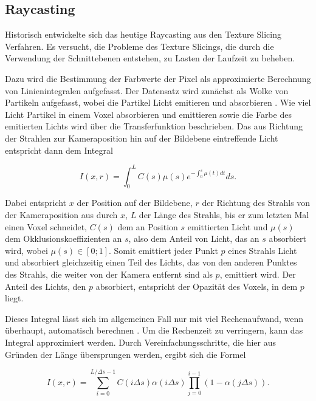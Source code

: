 \documentclass[a4paper,fontsize=12pt,toc=bib,parskip=half,ngerman]{scrartcl}
\begin{document}
\subsection{Raycasting}
\label{sec:Raycasting}

Historisch entwickelte sich das heutige Raycasting aus den Texture Slicing Verfahren. Es versucht, die Probleme des Texture Slicings, die durch die Verwendung der Schnittebenen entstehen, zu Lasten der Laufzeit zu beheben.

Dazu wird die Bestimmung der Farbwerte der Pixel als approximierte Berechnung von Linienintegralen aufgefasst. Der Datensatz wird zun\"achst als Wolke von Partikeln aufgefasst, wobei die Partikel Licht emitieren und absorbieren \cite[s.~134~f.]{hansen2005visualization}. Wie viel Licht Partikel in einem Voxel absorbieren und emittieren sowie die Farbe des emitierten Lichts wird \"uber die Transferfunktion beschrieben. Das aus Richtung der Strahlen zur Kameraposition hin auf der Bildebene eintreffende Licht entspricht dann dem Integral 

\begin{equation}
I(x,r) = \int_{0}^{L} C(s)\mu(s) e^{-\int_{0}^{s}\mu(t)dt}ds.
\end{equation}

Dabei entspricht $x$ der Position auf der Bildebene, $r$ der Richtung des Strahls von der Kameraposition aus durch $x$, $L$ der L\"ange des Strahls, bis er zum letzten Mal einen Voxel schneidet, $C(s)$ dem an Position $s$ emittierten Licht und $\mu(s)$ dem Okklusionskoeffizienten an $s$, also dem Anteil von Licht, das an $s$ absorbiert wird, wobei $\mu(s) \in [0;1]$. Somit emittiert jeder Punkt $p$ eines Strahls Licht und absorbiert gleichzeitig einen Teil des Lichts, das von den anderen Punktes des Strahls, die weiter von der Kamera entfernt sind als $p$, emittiert wird. Der Anteil des Lichts, den $p$ absorbiert, entspricht der Opazit\"at des Voxels, in dem $p$ liegt.

Dieses Integral l\"asst sich im allgemeinen Fall nur mit viel Rechenaufwand, wenn \"uberhaupt, automatisch berechnen \cite[S.~136]{hansen2005visualization}. Um die Rechenzeit zu verringern, kann das Integral approximiert werden. Durch Vereinfachungsschritte, die hier aus Gr\"unden der L\"ange \"ubersprungen werden, ergibt sich die Formel

\begin{equation}
I(x,r) = \sum_{i=0}^{L/\Delta s - 1} C(i\Delta s)\alpha(i\Delta s) \prod_{j=0}^{i-1}( 1 - \alpha(j \Delta s)).
\end{equation}
\end{document}
